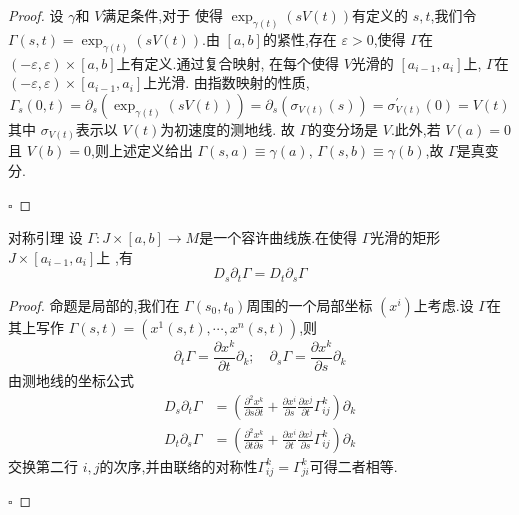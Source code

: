\documentclass[../../几何与拓扑.tex]{subfiles}
\begin{document}
\begin{proof}
    设 \(   \gamma   \)和 \(  V  \)满足条件,对于 使得 \(  \exp _{ \gamma \left( t \right) }\left( sV\left( t \right)  \right)   \)有定义的 \(  s,t  \),我们令 \(   \Gamma \left( s,t \right)=  \exp _{ \gamma \left( t \right) }\left( sV\left( t \right)  \right)    \).由 \(  \left[ a,b \right]   \)的紧性,存在 \(   \varepsilon >0  \),使得 \(   \Gamma   \)在 \(  \left( - \varepsilon , \varepsilon  \right)\times \left[ a,b \right]    \)上有定义.通过复合映射, 在每个使得 \(  V  \)光滑的 \(  \left[ a_{i-1},a_{i} \right]   \)上, \(   \Gamma   \)在 \(  \left( - \varepsilon , \varepsilon  \right)\times \left[ a_{i-1},a_{i} \right]    \)上光滑.  由指数映射的性质, \[
     \Gamma _{s}\left( 0,t \right)= \partial_{s} \left( \exp _{ \gamma \left( t \right) } \left( sV\left( t \right)  \right) \right)=   \partial _{s}  \left( \sigma _{V\left( t \right) }\left( s \right) \right)  =  \sigma ^{\prime} _{V\left( t \right) }\left( 0 \right)= V\left( t \right)  
    \] 其中 \(   \sigma _{V\left( t \right) }  \)表示以  \(  V\left( t \right)   \)为初速度的测地线.        故 \(   \Gamma   \)的变分场是 \(  V  \).此外,若 \(  V\left( a \right)= 0   \)且 \(  V\left( b \right)= 0   \),则上述定义给出 \(   \Gamma \left( s,a \right)\equiv  \gamma \left( a \right)    \), \(   \Gamma \left( s,b \right)\equiv  \gamma \left( b \right)    \),故 \(   \Gamma   \)是真变分.       

    \hfill $\square$
\end{proof}

\begin{lemma}{对称引理}\label{曲线族的对称引理}
    设 \(   \Gamma :J\times \left[ a,b \right]\to M   \)是一个容许曲线族.在使得 \(   \Gamma   \)光滑的矩形 \(  J\times \left[ a_{i-1},a_{i} \right]   \)上  ,有 \[
    D_{s}\partial _{t} \Gamma = D_{t}\partial _{s} \Gamma 
    \]
\end{lemma}

\begin{proof}
    命题是局部的,我们在 \(   \Gamma \left( s_0,t_0 \right)   \)周围的一个局部坐标 \(  \left( x^{i} \right)   \)上考虑.设 \(   \Gamma   \)在其上写作 \(   \Gamma \left( s,t \right)= \left( x^{1}\left( s,t \right),\cdots ,x^{n}\left( s,t \right)   \right)    \),则 \[
    \partial _{t} \Gamma = \frac{\partial x^{k}}{\partial t}\partial _{k};\quad \partial _{s} \Gamma = \frac{\partial x^{k}}{\partial s}\partial _{k}
    \]    由测地线的坐标公式 \[
    \begin{aligned}
    D_{s}\partial _{t} \Gamma & = \left( \frac{\partial ^{2}x^{k}}{\partial s \partial t}+  \frac{\partial x^{i}}{\partial s} \frac{\partial x^{j}}{\partial t} \Gamma _{ij}^{k} \right)\partial _{k}  \\ 
     D_{t}\partial _{s} \Gamma &= \left( \frac{\partial ^{2}x^{k}}{\partial t \partial s} + \frac{\partial x^{i}}{\partial t}\frac{\partial x^{j}}{\partial s}  \Gamma _{ij}^{k}\right)\partial _{k}  
    \end{aligned}
    \]交换第二行 \(  i,j  \)的次序,并由联络的对称性\(   \Gamma _{ij}^{k}=  \Gamma _{ji}^{k}  \)可得二者相等.  

    \hfill $\square$
\end{proof}
\end{document}
